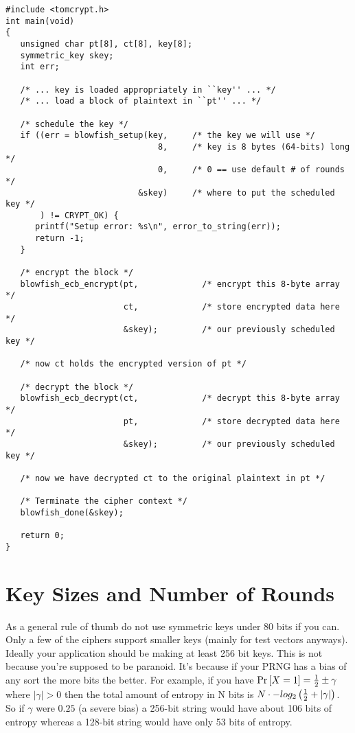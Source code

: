 \documentclass[a4paper]{book}
\begin{document}
\begin{small}
\begin{verbatim}
#include <tomcrypt.h>
int main(void)
{ 
   unsigned char pt[8], ct[8], key[8];
   symmetric_key skey;
   int err;

   /* ... key is loaded appropriately in ``key'' ... */
   /* ... load a block of plaintext in ``pt'' ... */

   /* schedule the key */
   if ((err = blowfish_setup(key,     /* the key we will use */
                               8,     /* key is 8 bytes (64-bits) long */
                               0,     /* 0 == use default # of rounds */
                           &skey)     /* where to put the scheduled key */
       ) != CRYPT_OK) {
      printf("Setup error: %s\n", error_to_string(err));
      return -1;
   }

   /* encrypt the block */
   blowfish_ecb_encrypt(pt,             /* encrypt this 8-byte array */
                        ct,             /* store encrypted data here */ 
                        &skey);         /* our previously scheduled key */
                        
   /* now ct holds the encrypted version of pt */                        

   /* decrypt the block */
   blowfish_ecb_decrypt(ct,             /* decrypt this 8-byte array */
                        pt,             /* store decrypted data here */
                        &skey);         /* our previously scheduled key */

   /* now we have decrypted ct to the original plaintext in pt */                        

   /* Terminate the cipher context */
   blowfish_done(&skey);

   return 0;
}
\end{verbatim}
\end{small}

\section{Key Sizes and Number of Rounds}
As a general rule of thumb do not use symmetric keys under 80 bits if you can.  Only a few of the ciphers support smaller
keys (mainly for test vectors anyways).  Ideally your application should be making at least 256 bit keys.  This is not
because you're supposed to be paranoid.  It's because if your PRNG has a bias of any sort the more bits the better.  For
example, if you have $\mbox{Pr}\left[X = 1\right] = {1 \over 2} \pm \gamma$ where $\vert \gamma \vert > 0$ then the
total amount of entropy in N bits is $N \cdot -log_2\left ({1 \over 2} + \vert \gamma \vert \right)$.  So if $\gamma$
were $0.25$ (a severe bias) a 256-bit string would have about 106 bits of entropy whereas a 128-bit string would have
only 53 bits of entropy.
\end{document}
